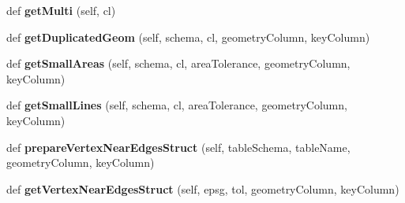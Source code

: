 \begin{DoxyCompactItemize}
def {\bfseries get\+Multi} (self, cl)
\item 
\mbox{\label{class_dsg_tools_1_1_factories_1_1_sql_factory_1_1postgis_sql_generator_1_1_post_g_i_s_sql_generator_a0ab65d733bd8ac52ff2e80f3572bea7a}} 
def {\bfseries get\+Duplicated\+Geom} (self, schema, cl, geometry\+Column, key\+Column)
\item 
\mbox{\label{class_dsg_tools_1_1_factories_1_1_sql_factory_1_1postgis_sql_generator_1_1_post_g_i_s_sql_generator_adf0bee5eafe9e21526886f8ffdcb2612}} 
def {\bfseries get\+Small\+Areas} (self, schema, cl, area\+Tolerance, geometry\+Column, key\+Column)
\item 
\mbox{\label{class_dsg_tools_1_1_factories_1_1_sql_factory_1_1postgis_sql_generator_1_1_post_g_i_s_sql_generator_aaf76f231ed0a9d4251a1213359d1706b}} 
def {\bfseries get\+Small\+Lines} (self, schema, cl, area\+Tolerance, geometry\+Column, key\+Column)
\item 
\mbox{\label{class_dsg_tools_1_1_factories_1_1_sql_factory_1_1postgis_sql_generator_1_1_post_g_i_s_sql_generator_ab744e6b3d8d26db6c12ed4fc0071c3f9}} 
def {\bfseries prepare\+Vertex\+Near\+Edges\+Struct} (self, table\+Schema, table\+Name, geometry\+Column, key\+Column)
\item 
\mbox{\label{class_dsg_tools_1_1_factories_1_1_sql_factory_1_1postgis_sql_generator_1_1_post_g_i_s_sql_generator_a91105ff4b733050945ae1975cc438d55}} 
def {\bfseries get\+Vertex\+Near\+Edges\+Struct} (self, epsg, tol, geometry\+Column, key\+Column)
\item 
\mbox{\label{class_dsg_tools_1_1_factories_1_1_sql_factory_1_1postgis_sql_generator_1_1_post_g_i_s_sql_generator_a1d66c5468c2737f34556aedf6295e8dc}} 

\end{DoxyCompactItemize}

